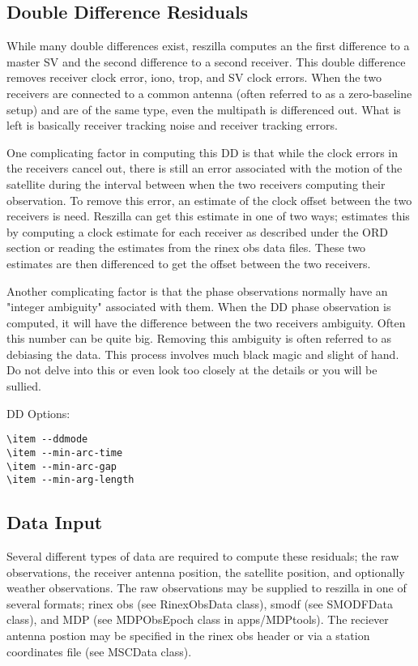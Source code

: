 \documentclass{article}
\begin{document}
\subsection{Double Difference Residuals}
While many double differences exist, reszilla computes an the first
difference to a master SV and the second difference to a second
receiver.  This double difference removes receiver clock error, iono,
trop, and SV clock errors. When the two receivers are connected to a
common antenna (often referred to as a zero-baseline setup) and are of
the same type, even the multipath is differenced out. What is left is
basically receiver tracking noise and receiver tracking errors.

One complicating factor in computing this DD is that while the clock
errors in the receivers cancel out, there is still an error associated
with the motion of the satellite during the interval between when the
two receivers computing their observation. To remove this error, an
estimate of the clock offset between the two receivers is
need. Reszilla can get this estimate in one of two ways; estimates
this by computing a clock estimate for each receiver as described
under the ORD section or reading the estimates from the rinex obs data
files. These two estimates are then differenced to get the offset
between the two receivers.

Another complicating factor is that the phase observations normally
have an "integer ambiguity" associated with them. When the DD phase
observation is computed, it will have the difference between the two
receivers ambiguity. Often this number can be quite big. Removing this
ambiguity is often referred to as debiasing the data. This process
involves much black magic and slight of hand. Do not delve into this
or even look too closely at the details or you will be sullied.

DD Options:

\begin{verbatim}
\item --ddmode
\item --min-arc-time
\item --min-arc-gap
\item --min-arg-length
\end{verbatim}

\subsection{Data Input}

Several different types of data are required to compute these
residuals; the raw observations, the receiver antenna position, the
satellite position, and optionally  weather observations. The raw
observations may be supplied to reszilla in one of several formats;
rinex obs (see RinexObsData class), smodf (see SMODFData class), and
MDP (see MDPObsEpoch class in apps/MDPtools). The reciever antenna
postion may be specified in the rinex obs header or via a station
coordinates file (see MSCData class).
\end{document}
